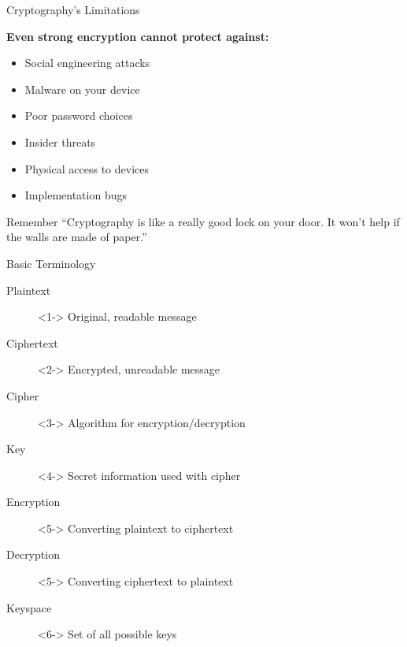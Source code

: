 \documentclass{beamer}
\begin{document}
\begin{frame}{Cryptography's Limitations}



\textbf{Even strong encryption cannot protect against:}
\begin{itemize}
    \item Social engineering attacks
    \item Malware on your device
    \item Poor password choices
    \item Insider threats
    \item Physical access to devices
    \item Implementation bugs
\end{itemize}\pause

\begin{alertblock}{Remember}
``Cryptography is like a really good lock on your door. It won't help if the walls are made of paper.''
\end{alertblock}
\end{frame}

\begin{frame}{Basic Terminology}
\begin{description}
    \item[Plaintext]<1-> Original, readable message
    \item[Ciphertext]<2-> Encrypted, unreadable message
    \item[Cipher]<3-> Algorithm for encryption/decryption
    \item[Key]<4-> Secret information used with cipher
    \item[Encryption]<5-> Converting plaintext to ciphertext
    \item[Decryption]<5-> Converting ciphertext to plaintext
    \item[Keyspace]<6-> Set of all possible keys
\end{description}

\end{frame}


\end{document}
